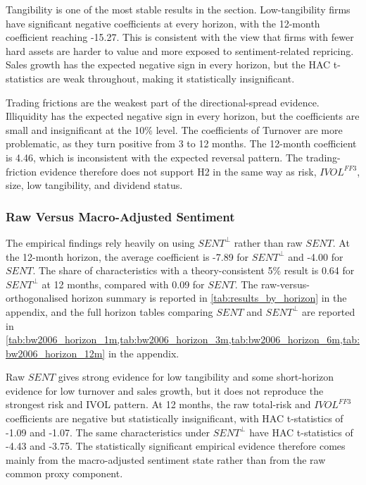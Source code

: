 \documentclass[11pt]{article}
\newcommand{\var}[1]{\ensuremath{#1}}
\begin{document}
Tangibility is one of the most stable results in the section. Low-tangibility firms have significant negative coefficients at every horizon, with the 12-month coefficient reaching -15.27. This is consistent with the view that firms with fewer hard assets are harder to value and more exposed to sentiment-related repricing. Sales growth has the expected negative sign in every horizon, but the HAC t-statistics are weak throughout, making it statistically insignificant.

Trading frictions are the weakest part of the directional-spread evidence. Illiquidity has the expected negative sign in every horizon, but the coefficients are small and insignificant at the 10\% level. The coefficients of Turnover are more problematic, as they turn positive from 3 to 12 months. The 12-month coefficient is 4.46, which is inconsistent with the expected reversal pattern. The trading-friction evidence therefore does not support H2 in the same way as risk, \var{IVOL^{FF3}}, size, low tangibility, and dividend status.

\subsubsection{Raw Versus Macro-Adjusted Sentiment}
The empirical findings rely heavily on using \var{SENT^{\perp}} rather than raw \var{SENT}. At the 12-month horizon, the average coefficient is -7.89 for \var{SENT^{\perp}} and -4.00 for \var{SENT}. The share of characteristics with a theory-consistent 5\% result is 0.64 for \var{SENT^{\perp}} at 12 months, compared with 0.09 for \var{SENT}. The raw-versus-orthogonalised horizon summary is reported in \cref{tab:results_by_horizon} in the appendix, and the full horizon tables comparing \var{SENT} and \var{SENT^{\perp}} are reported in \cref{tab:bw2006_horizon_1m,tab:bw2006_horizon_3m,tab:bw2006_horizon_6m,tab:bw2006_horizon_12m} in the appendix.

Raw \var{SENT} gives strong evidence for low tangibility and some short-horizon evidence for low turnover and sales growth, but it does not reproduce the strongest risk and IVOL pattern. At 12 months, the raw total-risk and \var{IVOL^{FF3}} coefficients are negative but statistically insignificant, with HAC t-statistics of -1.09 and -1.07. The same characteristics under \var{SENT^{\perp}} have HAC t-statistics of -4.43 and -3.75. The statistically significant empirical evidence therefore comes mainly from the macro-adjusted sentiment state rather than from the raw common proxy component.
\end{document}
